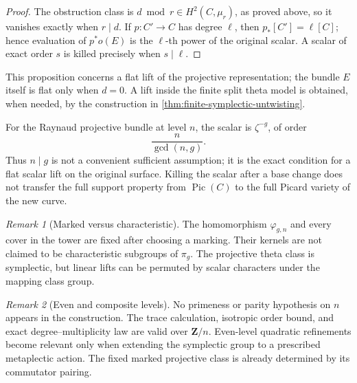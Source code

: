 \documentclass[11pt,reqno]{amsart}
\numberwithin{equation}{section}
\theoremstyle{remark}
\newtheorem{remark}[remark]{Remark}
\DeclareMathOperator{\Pic}{Pic}
\newcommand{\bZ}{\mathbf Z}
\begin{document}
\begin{proof}
The obstruction class is \(d\bmod r\in H^2(C,\mu_r)\), as proved above,
so it vanishes exactly when \(r\mid d\).  If \(p\colon C'\to C\) has
degree \(\ell\), then
\(p_*[C']=\ell[C]\); hence evaluation of \(p^*o(E)\) is the
\(\ell\)-th power of the original scalar.  A scalar of exact order
\(s\) is killed precisely when \(s\mid\ell\).
\end{proof}

This proposition concerns a flat lift of the projective representation;
the bundle \(E\) itself is flat only when \(d=0\).  A lift inside the
finite split theta model is obtained, when needed, by the construction
in \cref{thm:finite-symplectic-untwisting}.

For the Raynaud projective bundle at level \(n\), the scalar is
\(\zeta^{-g}\), of order
\[
 \frac n{\gcd(n,g)}.
\tag{9.2}\label{eq:raynaud-obstruction-order}
\]
Thus \(n\mid g\) is not a convenient sufficient assumption; it is the
exact condition for a flat scalar lift on the original surface.  Killing
the scalar after a base change does not transfer the full support
property from \(\Pic(C)\) to the full Picard variety of the new curve.

\begin{remark}[Marked versus characteristic]\label{rem:marked-characteristic}
The homomorphism \(\varphi_{g,n}\) and every cover in the tower are fixed
after choosing a marking.  Their kernels are not claimed to be
characteristic subgroups of \(\pi_g\).  The projective theta class is
symplectic, but linear lifts can be permuted by scalar characters under
the mapping class group.
\end{remark}

\begin{remark}[Even and composite levels]\label{rem:even-composite}
No primeness or parity hypothesis on \(n\) appears in the construction.
The trace calculation, isotropic order bound, and exact
degree--multiplicity law are valid over \(\bZ/n\).  Even-level quadratic
refinements become relevant only when extending the symplectic group to
a prescribed metaplectic action.  The fixed marked projective class is
already determined by its commutator pairing.
\end{remark}
\end{document}
